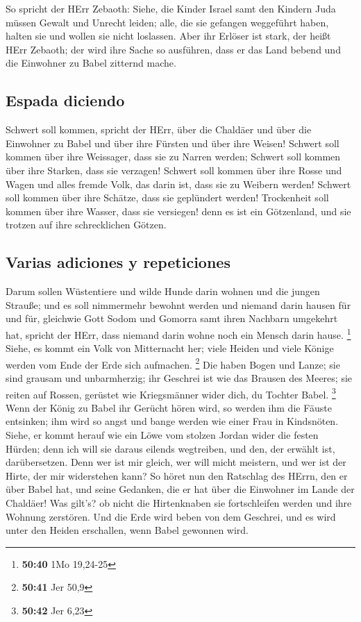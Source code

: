  So spricht der HErr Zebaoth: Siehe, die Kinder Israel
samt den Kindern Juda müssen Gewalt und Unrecht leiden; alle, die sie
gefangen weggeführt haben, halten sie und wollen sie nicht loslassen.
 Aber ihr Erlöser ist stark, der heißt HErr Zebaoth; der
wird ihre Sache so ausführen, dass er das Land bebend und die Einwohner
zu Babel zitternd mache.

\hypertarget{espada-diciendo}{%
\subsection{Espada diciendo}\label{espada-diciendo}}

 Schwert soll kommen, spricht der HErr, über die Chaldäer
und über die Einwohner zu Babel und über ihre Fürsten und über ihre
Weisen!  Schwert soll kommen über ihre Weissager, dass
sie zu Narren werden; Schwert soll kommen über ihre Starken, dass sie
verzagen!  Schwert soll kommen über ihre Rosse und Wagen
und alles fremde Volk, das darin ist, dass sie zu Weibern werden!
Schwert soll kommen über ihre Schätze, dass sie geplündert werden!
 Trockenheit soll kommen über ihre Wasser, dass sie
versiegen! denn es ist ein Götzenland, und sie trotzen auf ihre
schrecklichen Götzen.

\hypertarget{varias-adiciones-y-repeticiones}{%
\subsection{Varias adiciones y
repeticiones}\label{varias-adiciones-y-repeticiones}}

 Darum sollen Wüstentiere und wilde Hunde darin wohnen
und die jungen Strauße; und es soll nimmermehr bewohnt werden und
niemand darin hausen für und für,  gleichwie Gott Sodom
und Gomorra samt ihren Nachbarn umgekehrt hat, spricht der HErr, dass
niemand darin wohne noch ein Mensch darin hause. \footnote{\textbf{50:40}
  1Mo 19,24-25}  Siehe, es kommt ein Volk von Mitternacht
her; viele Heiden und viele Könige werden vom Ende der Erde sich
aufmachen. \footnote{\textbf{50:41} Jer 50,9}  Die haben
Bogen und Lanze; sie sind grausam und unbarmherzig; ihr Geschrei ist wie
das Brausen des Meeres; sie reiten auf Rossen, gerüstet wie Kriegsmänner
wider dich, du Tochter Babel. \footnote{\textbf{50:42} Jer 6,23}
 Wenn der König zu Babel ihr Gerücht hören wird, so
werden ihm die Fäuste entsinken; ihm wird so angst und bange werden wie
einer Frau in Kindsnöten.  Siehe, er kommt herauf wie ein
Löwe vom stolzen Jordan wider die festen Hürden; denn ich will sie
daraus eilends wegtreiben, und den, der erwählt ist, darübersetzen. Denn
wer ist mir gleich, wer will micht meistern, und wer ist der Hirte, der
mir widerstehen kann?  So höret nun den Ratschlag des
HErrn, den er über Babel hat, und seine Gedanken, die er hat über die
Einwohner im Lande der Chaldäer! Was gilt's? ob nicht die Hirtenknaben
sie fortschleifen werden und ihre Wohnung zerstören.  Und
die Erde wird beben von dem Geschrei, und es wird unter den Heiden
erschallen, wenn Babel gewonnen wird.

